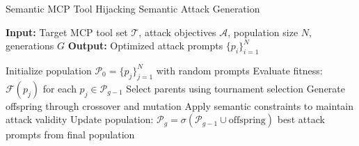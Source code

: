 \begin{algorithm}[t]
\caption{Semantic MCP Tool Hijacking Semantic Attack Generation}
\label{alg:genetic-attack}
\begin{algorithmic}[1]
\Statex \textbf{Input:} Target MCP tool set $\mathcal{T}$, attack objectives $\mathcal{A}$, population size $N$, generations $G$
\Statex \textbf{Output:} Optimized attack prompts $\{p_i\}_{i=1}^N$

\State Initialize population $\mathcal{P}_0 = \{p_j\}_{j=1}^N$ with random prompts
    \State Evaluate fitness: $\mathcal{F}(p_j)$ for each $p_j \in \mathcal{P}_{g-1}$
    \State Select parents using tournament selection
    \State Generate offspring through crossover and mutation
    \State Apply semantic constraints to maintain attack validity
    \State Update population: $\mathcal{P}_g = \sigma(\mathcal{P}_{g-1} \cup \text{offspring})$
\EndFor
\State \Return best attack prompts from final population

\end{algorithmic}
\end{algorithm}